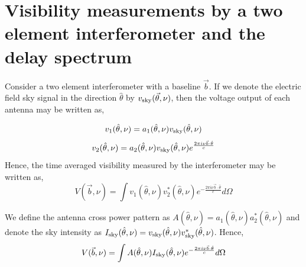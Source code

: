 \documentclass[twocolumn]{emulateapj}
\newcommand{\volt}{{v}}
\newcommand{\vis}{{V}}
\newcommand{\sky}{{\rm sky}}
\newcommand{\bmvolt}{{a}}
\newcommand{\beam}{{A}}
\newcommand{\thhat}{{\hat\theta}}
\newcommand{\fngexp}{{e^{\frac{2\pi i\nu\vec{b}\cdot\thhat}{c}}}}
\newcommand{\ifngexp}{{e^{-\frac{2\pi i\nu\vec{b}\cdot\thhat}{c}}}}
\begin{document}
    
    \section{\textbf{Visibility measurements by a two element interferometer and the delay spectrum}}
    Consider a two element interferometer with a baseline $\vec b$. If we denote the electric field sky signal in the direction $\thhat$ by $\volt_\sky(\vec \theta, \nu)$, then the voltage output of each antenna may be written as,  
    
    \begin{equation}
    \volt_{1}(\thhat, \nu) = \bmvolt_{1}(\thhat,\nu)\volt_\sky(\thhat,\nu)\nonumber\\
    \end{equation}
    \begin{equation}
    \volt_{2} (\thhat, \nu)= \bmvolt_{2}(\thhat,\nu)\volt_\sky(\thhat,\nu)\fngexp\nonumber\\
    \end{equation}
    Hence, the time averaged visibility measured by the interferometer may be written as, 
    \begin{equation}
    \vis(\vec b, \nu) =  \int  \volt_{1}(\thhat,\nu)  \volt_{2}^{*} (\thhat, \nu) \ifngexp d\Omega 
    \label{eq1}
    \end{equation}
    
    We define the antenna cross power pattern as  $\beam(\thhat,\nu)=\bmvolt_{1}(\thhat,\nu)\bmvolt_{2}^{*}(\thhat,\nu)$ and denote the sky intensity as  $I_\sky(\thhat,\nu)=\volt_\sky(\thhat,\nu)\volt_\sky^{*}(\thhat,\nu)$. Hence, 
    \begin{equation}
    \vis(\vec b,\nu) = \int \beam(\thhat, \nu) I_\sky(\thhat,\nu) \ifngexp d\Omega
    \label{eq2}
    \end{equation}
    
\end{document}
